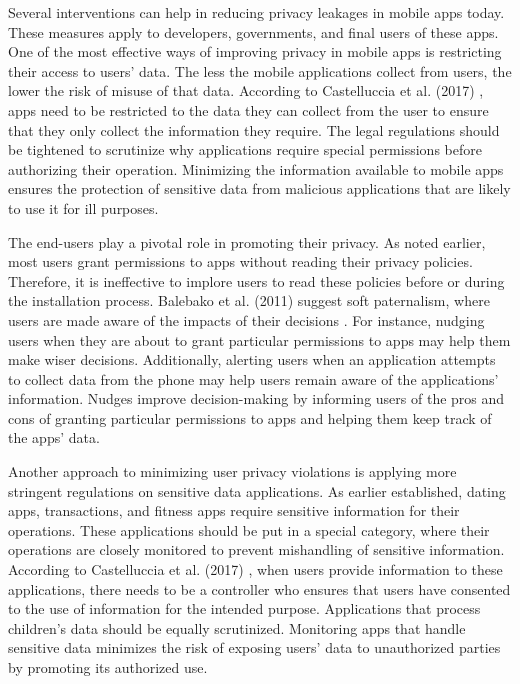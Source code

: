 \documentclass{article}
\begin{document}
\medskip

Several interventions can help in reducing privacy leakages in mobile apps today. These measures apply to developers, governments, and final users of these apps. One of the most effective ways of improving privacy in mobile apps is restricting their access to users’ data. The less the mobile applications collect from users, the lower the risk of misuse of that data. According to Castelluccia et al. (2017) \cite{Castelluccia17}, apps need to be restricted to the data they can collect from the user to ensure that they only collect the information they require. The legal regulations should be tightened to scrutinize why applications require special permissions before authorizing their operation. Minimizing the information available to mobile apps ensures the protection of sensitive data from malicious applications that are likely to use it for ill purposes.


\medskip

The end-users play a pivotal role in promoting their privacy. As noted earlier, most users grant permissions to apps without reading their privacy policies. Therefore, it is ineffective to implore users to read these policies before or during the installation process. Balebako et al. (2011) suggest soft paternalism, where users are made aware of the impacts of their decisions \cite{Rebecca21}. For instance, nudging users when they are about to grant particular permissions to apps may help them make wiser decisions. Additionally, alerting users when an application attempts to collect data from the phone may help users remain aware of the applications’ information. Nudges improve decision-making by informing users of the pros and cons of granting particular permissions to apps and helping them keep track of the apps’ data.


\medskip

Another approach to minimizing user privacy violations is applying more stringent regulations on sensitive data applications. As earlier established, dating apps, transactions, and fitness apps require sensitive information for their operations. These applications should be put in a special category, where their operations are closely monitored to prevent mishandling of sensitive information. According to Castelluccia et al. (2017) \cite{Castelluccia17}, when users provide information to these applications, there needs to be a controller who ensures that users have consented to the use of information for the intended purpose. Applications that process children’s data should be equally scrutinized. Monitoring apps that handle sensitive data minimizes the risk of exposing users’ data to unauthorized parties by promoting its authorized use.
\end{document}
